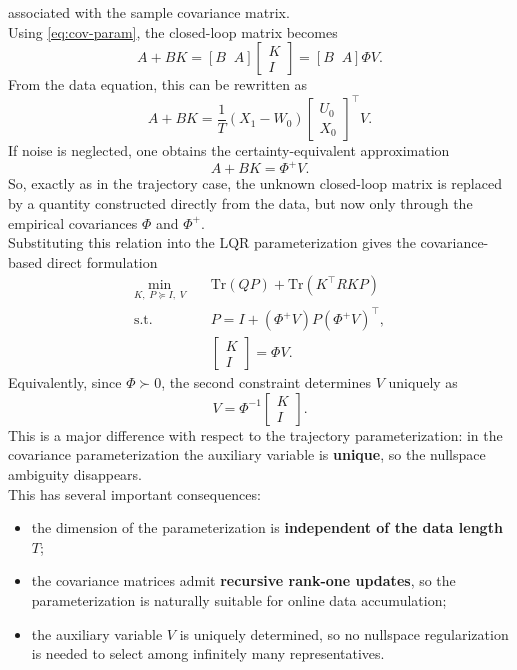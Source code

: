 associated with the sample covariance matrix.\\
Using \eqref{eq:cov-param}, the closed-loop matrix becomes
\[
A+BK
=
[B\;\;A]
\begin{bmatrix}
K\\[0.3em]
I
\end{bmatrix}
=
[B\;\;A]\Phi V.
\]
From the data equation, this can be rewritten as
\[
A+BK
=
\frac{1}{T}(X_1-W_0)
\begin{bmatrix}
U_0\\[0.3em]
X_0
\end{bmatrix}^\top V.
\]
If noise is neglected, one obtains the certainty-equivalent approximation
\[
A+BK = \Phi^+ V.
\]
So, exactly as in the trajectory case, the unknown closed-loop matrix is replaced by a quantity
constructed directly from the data, but now only through the empirical covariances $\Phi$ and
$\Phi^+$.\\
Substituting this relation into the LQR parameterization gives the covariance-based direct
formulation
\[
\begin{aligned}
\min_{K,\;P \succeq I,\;V}\quad
& \text{Tr}(QP)+\text{Tr}(K^\top RKP)\\
\text{s.t.}\quad
& P = I + (\Phi^+V)P(\Phi^+V)^\top,\\
& \begin{bmatrix}
K\\[0.3em]
I
\end{bmatrix}
= \Phi V.
\end{aligned}
\]
Equivalently, since $\Phi \succ 0$, the second constraint determines $V$ uniquely as
\[
V = \Phi^{-1}
\begin{bmatrix}
K\\[0.3em]
I
\end{bmatrix}.
\]
This is a major difference with respect to the trajectory parameterization: in the covariance
parameterization the auxiliary variable is \textbf{unique}, so the nullspace ambiguity disappears.\\
This has several important consequences:
\begin{itemize}
    \item the dimension of the parameterization is \textbf{independent of the data length} $T$;
    \item the covariance matrices admit \textbf{recursive rank-one updates}, so the parameterization is
    naturally suitable for online data accumulation;
    \item the auxiliary variable $V$ is uniquely determined, so no nullspace regularization is
    needed to select among infinitely many representatives.
\end{itemize}
